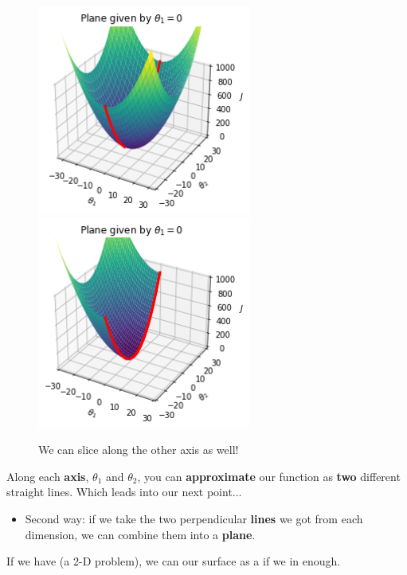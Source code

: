         \begin{figure}[H]
                \includegraphics[width=70mm,scale=0.5]{images/gradient_descent_images/theta1_eq_0_unsliced.png}
                \includegraphics[width=70mm,scale=0.5]{images/gradient_descent_images/theta1_eq_0_sliced.png}
            
            \caption*{We can slice along the other axis as well!}
        \end{figure}

        Along each \textbf{axis}, $\theta_1$ and $\theta_2$, you can \textbf{approximate} our function as \textbf{two} different straight lines. Which leads into our next point...
        
        \begin{itemize}
            \item Second way: if we take the two perpendicular \textbf{lines} we got from each dimension, we can combine them into a \textbf{plane}.\\
        \end{itemize}
        
        \begin{concept}
            If we have  (a 2-D problem), we can  our surface as a  if we  in enough.
        \end{concept}
        
